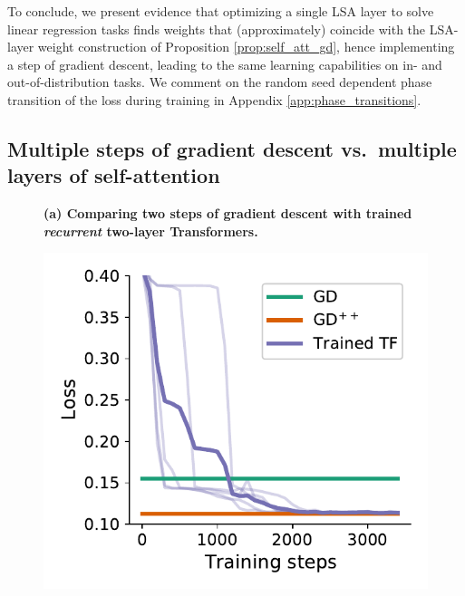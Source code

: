 \documentclass{article}
\theoremstyle{plain}
\theoremstyle{definition}
\theoremstyle{remark}
\begin{document}
To conclude, we present evidence that optimizing a single LSA layer to solve linear regression tasks finds weights that (approximately) coincide with the LSA-layer weight construction of Proposition \ref{prop:self_att_gd}, hence  implementing a step of gradient descent, leading to the same learning capabilities on in- and out-of-distribution tasks. We comment on the random seed dependent phase transition of the loss during training in Appendix \ref{app:phase_transitions}.

\subsection*{Multiple steps of gradient descent vs.~multiple layers of self-attention}

\begin{figure}
\textbf{(a) Comparing two steps of gradient descent with trained \textit{recurrent} two-layer Transformers.}
\begin{center}
\begin{minipage}{.24\textwidth}
  \centering
  \begin{center}
    \includegraphics[width=1.\textwidth]{Final_figures/linear/two_layers_rec/train.pdf}
  \end{center}
  \vspace{-10pt}
\end{minipage}
\begin{minipage}{.24\textwidth}
  \centering
  \begin{center}

\end{center}
\end{minipage}
\end{center}
\end{figure}
\end{document}
